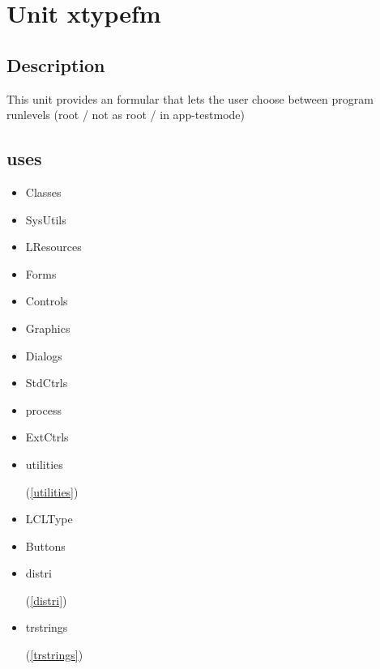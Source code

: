 \documentclass{report}
\begin{document}
\chapter{Unit xtypefm}
\label{xtypefm}
\section{Description}
This unit provides an formular that lets the user choose between program runlevels (root / not as root / in app{-}testmode)
\section{uses}
\begin{itemize}
\item \begin{ttfamily}Classes\end{ttfamily}\item \begin{ttfamily}SysUtils\end{ttfamily}\item \begin{ttfamily}LResources\end{ttfamily}\item \begin{ttfamily}Forms\end{ttfamily}\item \begin{ttfamily}Controls\end{ttfamily}\item \begin{ttfamily}Graphics\end{ttfamily}\item \begin{ttfamily}Dialogs\end{ttfamily}\item \begin{ttfamily}StdCtrls\end{ttfamily}\item \begin{ttfamily}process\end{ttfamily}\item \begin{ttfamily}ExtCtrls\end{ttfamily}\item \begin{ttfamily}utilities\end{ttfamily}(\ref{utilities})\item \begin{ttfamily}LCLType\end{ttfamily}\item \begin{ttfamily}Buttons\end{ttfamily}\item \begin{ttfamily}distri\end{ttfamily}(\ref{distri})\item \begin{ttfamily}trstrings\end{ttfamily}(\ref{trstrings})\end{itemize}
\end{document}
